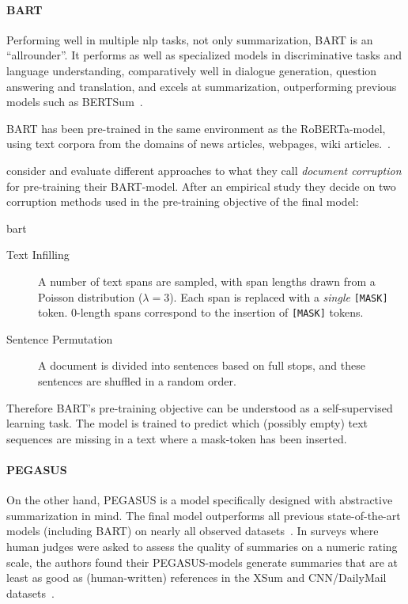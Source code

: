 \paragraph{BART}

Performing well in multiple \ac{nlp} tasks, not only summarization, BART is an \enquote{allrounder}.
It performs as well as specialized models in discriminative tasks and language understanding,
comparatively well in dialogue generation, question answering and translation,
and excels at summarization, outperforming previous models such as BERTSum~\parencite[7876-7877]{bart}.

BART has been pre-trained in the same environment as the RoBERTa-model,
using text corpora from the domains of news articles, webpages, wiki articles.~\parencite[3]{roberta}.

\citeauthor*{bart} consider and evaluate different approaches to what they call
\emph{document corruption} for pre-training their BART-model. %
After an empirical study they decide on two corruption methods
used in the pre-training objective of the final model: %
\begin{displaycquote}[7873]{bart}
\begin{description}
\item[Text Infilling] A number of text spans are sampled,
      with span lengths drawn from a Poisson distribution (\(\lambda = 3\)).
      Each span is replaced with a \emph{single} \verb+[MASK]+ token.
      0-length spans correspond to the insertion of \verb+[MASK]+ tokens.
      \textelp{}
\item[Sentence Permutation] A document is divided into sentences based on full stops,
      and these sentences are shuffled in a random order.
\end{description}
\end{displaycquote}

Therefore BART's pre-training objective can be understood as a self-supervised learning task.
The model is trained to predict which (possibly empty) text sequences are missing in a text
where a mask-token has been inserted.

\paragraph{PEGASUS}

On the other hand, PEGASUS is a model specifically designed with
abstractive summarization in mind.
The final model outperforms all previous state-of-the-art models
(including BART) on nearly all observed datasets~\parencite[11328-11329,11334]{pegasus}.
In surveys where human judges were asked to assess the quality of summaries on a numeric rating scale,
the authors found their PEGASUS-models generate summaries that are at least
as good as (human-written) references in the XSum and
CNN/DailyMail datasets~\parencite[11335]{pegasus}.

